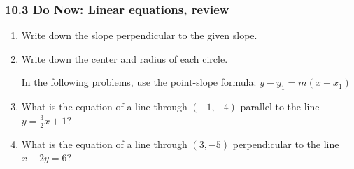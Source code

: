 \documentclass[12pt, twoside]{article}
\begin{document}
\subsubsection*{10.3 Do Now: Linear equations, review}
  \begin{enumerate}


  \item Write down the slope perpendicular to the given slope. \vspace{0.5cm}
  \begin{enumerate}
  \end{enumerate}

  \item Write down the center and radius of each circle.
  \begin{enumerate}
  \end{enumerate}  \vspace{2cm}

  In the following problems, use the point-slope formula: $y-y_1=m (x-x_1)$
  \item What is the equation of a line through $(-1,-4)$ parallel to the line $y=\frac{3}{2}x+1$?  \vspace{2cm}
  \item What is the equation of a line through $(3,-5)$ perpendicular to the line $x-2y=6$?  \vspace{3cm}
  

\end{enumerate}
\end{document}
